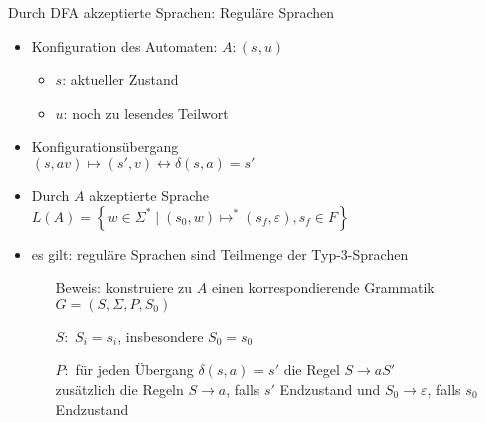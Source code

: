 \begin{frame}{Durch DFA akzeptierte Sprachen: Reguläre Sprachen}
	\begin{itemize}
		\item Konfiguration des Automaten: $A: (s,u)$
		\begin{itemize}
			\item $s$: aktueller Zustand
			\item $u$: noch zu lesendes Teilwort
		\end{itemize}
		\item Konfigurationsübergang\\
		\quad $(s, av) \mapsto (s', v) \leftrightarrow \delta(s,a) = s'$
		\item Durch $A$ akzeptierte Sprache\\
		\quad $L(A) = \left\{w \in \Sigma^* \mid (s_0,w) \mapsto^* (s_f, \varepsilon), s_f \in F \right\}$
		\item es gilt: reguläre Sprachen sind Teilmenge der Typ-3-Sprachen\\
		\begin{itemize}
			\item[Beweis:] konstruiere zu $A$ einen korrespondierende Grammatik $G=(S,\Sigma,P,S_0)$\\
			\item[$S:$] $S_i=s_i$, insbesondere $S_0=s_0$
			\item[$P:$] für jeden Übergang $\delta(s,a)=s'$ die Regel $S \rightarrow aS'$\\
			zusätzlich die Regeln $S \rightarrow a$, falls $s'$ Endzustand und $S_0 \rightarrow \varepsilon$, falls $s_0$ Endzustand
		\end{itemize}
	\end{itemize}
\end{frame}

